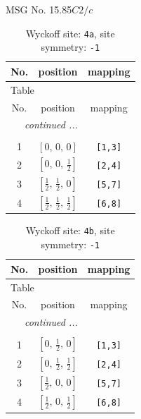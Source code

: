 \documentclass[fleqn,8pt]{jsarticle}
\begin{document}
\setcounter{MaxMatrixCols}{32}

\renewcommand{\tablename}{Table~}
\renewcommand{\figurename}{Figure~}
\begin{center}
\LARGE
MSG No. 15.85\quad$C2/c$
\end{center}
\renewcommand{\arraystretch}{1.2}
\begin{longtable}{ccc}
\caption{Wyckoff site: {\tt 4a}, site symmetry: {\tt -1}}
 \\
 \hline \hline
No. & position & mapping \\ \hline \endfirsthead

\multicolumn{2}{l}{\tablename\ \thetable{}} \\
 \hline \hline
No. & position & mapping \\ \hline \endhead

 \hline \hline
\multicolumn{2}{r}{\footnotesize\it continued ...} \\ \endfoot

 \hline \hline
\multicolumn{2}{r}{} \\ \endlastfoot

1 & $\left[ 0,\, 0,\, 0 \right]$ & {\tt [1,3]} \\ \hline
2 & $\left[ 0,\, 0,\, \frac{1}{2} \right]$ & {\tt [2,4]} \\ \hline
3 & $\left[ \frac{1}{2},\, \frac{1}{2},\, 0 \right]$ & {\tt [5,7]} \\ \hline
4 & $\left[ \frac{1}{2},\, \frac{1}{2},\, \frac{1}{2} \right]$ & {\tt [6,8]} \\
\end{longtable}
\renewcommand{\arraystretch}{1.2}
\begin{longtable}{ccc}
\caption{Wyckoff site: {\tt 4b}, site symmetry: {\tt -1}}
 \\
 \hline \hline
No. & position & mapping \\ \hline \endfirsthead

\multicolumn{2}{l}{\tablename\ \thetable{}} \\
 \hline \hline
No. & position & mapping \\ \hline \endhead

 \hline \hline
\multicolumn{2}{r}{\footnotesize\it continued ...} \\ \endfoot

 \hline \hline
\multicolumn{2}{r}{} \\ \endlastfoot

1 & $\left[ 0,\, \frac{1}{2},\, 0 \right]$ & {\tt [1,3]} \\ \hline
2 & $\left[ 0,\, \frac{1}{2},\, \frac{1}{2} \right]$ & {\tt [2,4]} \\ \hline
3 & $\left[ \frac{1}{2},\, 0,\, 0 \right]$ & {\tt [5,7]} \\ \hline
4 & $\left[ \frac{1}{2},\, 0,\, \frac{1}{2} \right]$ & {\tt [6,8]} \\
\end{longtable}
\end{document}

